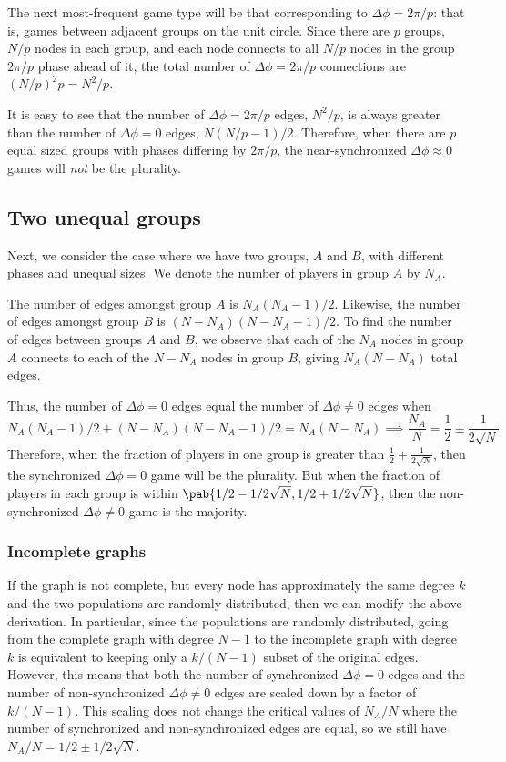 The next most-frequent game type will be that corresponding to
$\Delta \phi = 2 \pi/p$:
that is, games between adjacent groups on the unit circle.
Since there are $p$ groups,
$N/p$ nodes in each group,
and each node connects to all $N/p$ nodes in the group
$2 \pi/p$ phase ahead of it,
the total number of $\Delta \phi = 2 \pi/p$ connections
are $(N/p)^2 p = N^2/p$.

It is easy to see that the number of $\Delta \phi = 2\pi/p$ edges,
$N^2/p$,
is always greater than the number of $\Delta \phi = 0$ edges,
$N(N/p - 1)/2$.
Therefore, when there are $p$ equal sized groups
with phases differing by $2\pi/p$,
the near-synchronized $\Delta \phi \approx 0$ games will \emph{not} be the plurality.

\subsection{Two unequal groups}\label{sec:two_unequal_groups}
Next, we consider the case where we have two groups, $A$ and $B$,
with different phases and unequal sizes.
We denote the number of players in group $A$ by $N_A$.

The number of edges amongst group $A$ is $N_A (N_A - 1)/2$.
Likewise, the number of edges amongst group $B$ is
$(N-N_A) (N - N_A - 1)/2$.
To find the number of edges between groups $A$ and $B$,
we observe that each of the $N_A$ nodes in group $A$
connects to each of the $N - N_A$ nodes in group $B$,
giving $N_A (N - N_A)$ total edges.

Thus, the number of $\Delta \phi = 0$ edges
equal the number of $\Delta \phi \neq 0$ edges when
\begin{equation*}
  N_A (N_A - 1)/2 + (N - N_A) (N - N_A - 1)/2 = N_A (N - N_A)
  \implies \frac{N_A}{N} = \frac{1}{2} \pm \frac{1}{2 \sqrt{N}}
\end{equation*}
Therefore, when the fraction of players in one group is greater than
$\frac{1}{2} + \frac{1}{2\sqrt{N}}$,
then the synchronized $\Delta \phi = 0$ game will be the plurality.
But when the fraction of players in each group is within
$\pab{1/2 - 1/2\sqrt{N}, 1/2 + 1/2\sqrt{N}}$,
then the non-synchronized $\Delta \phi \neq 0$ game is the majority.

\subsubsection{Incomplete graphs}\label{sec:two_unequal_groups_incomplete}
If the graph is not complete,
but every node has approximately the same degree $k$
and the two populations are randomly distributed,
then we can modify the above derivation.
In particular, since the populations are randomly distributed,
going from the complete graph with degree $N-1$
to the incomplete graph with degree $k$
is equivalent to keeping only a $k/(N-1)$ subset
of the original edges.
However, this means that both the number
of synchronized $\Delta \phi = 0$ edges
and the number of non-synchronized $\Delta \phi \neq 0$ edges
are scaled down by a factor of $k/(N-1)$.
This scaling does not change the critical values of $N_A/N$
where the number of synchronized and non-synchronized edges are equal,
so we still have $N_A/N = 1/2 \pm 1/2\sqrt{N}$.
